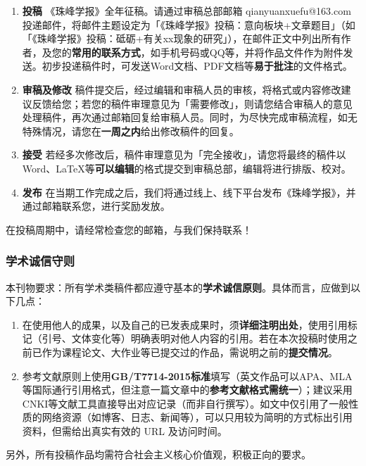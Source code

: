 \documentclass[
decoration,  %
]{qyxf-book}
\begin{document}
\begin{multicols}{2}
	\begin{enumerate}[\bfseries 1.]
		\item 
		\textbf{投稿} \;\;《珠峰学报》全年征稿。请通过审稿总部邮箱 qianyuanxuefu@163.com投递邮件，将邮件主题设定为「《珠峰学报》投稿：意向板块+文章题目」（如「《珠峰学报》投稿：砥砺+有关xx现象的研究」），在邮件正文中列出所有作者，及您的\textbf{常用的联系方式}，如手机号码或QQ等，并将作品文件作为附件发送。初步投递稿件时，可发送Word文档、PDF文档等\textbf{易于批注}的文件格式。
		\item
		\textbf{审稿及修改} \;\;稿件提交后，经过编辑和审稿人员的审核，将格式或内容修改建议反馈给您；若您的稿件审理意见为「需要修改」，则请您结合审稿人的意见处理稿件，再次通过邮箱回复给审稿人员。同时，为尽快完成审稿流程，如无特殊情况，请您在\textbf{一周之内}给出修改稿件的回复。
		\item
		\textbf{接受} \;\;若经多次修改后，稿件审理意见为「完全接收」，请您将最终的稿件以 Word、\LaTeX 等\textbf{可以编辑}的格式提交到审稿总部，编辑将进行排版、校对。
		\item
		\textbf{发布} \;\;在当期工作完成之后，我们将通过线上、线下平台发布《珠峰学报》，并通过邮箱联系您，进行奖励发放。
	\end{enumerate}
	
	在投稿周期中，请经常检查您的邮箱，与我们保持联系！
	
	
	\subsubsection{学术诚信守则}
	
    本刊物要求：所有学术类稿件都应遵守基本的\textbf{学术诚信原则}。具体而言，应做到以下几点：
	
	\begin{enumerate}[\bfseries 1.]
		\item
        在使用他人的成果，以及自己的已发表成果时，须\textbf{详细注明出处}，使用引用标记（引号、文体变化等）明确表明对他人内容的引用。若在本次投稿时使用之前已作为课程论文、大作业等已提交过的作品，需说明之前的\textbf{提交情况}。
		\item
        参考文献原则上使用\textbf{GB/T7714-2015标准}填写（英文作品可以APA、MLA等国际通行引用格式，但注意一篇文章中的\textbf{参考文献格式需统一}）；建议采用CNKI等文献工具直接导出对应记录（而非自行撰写）。如文中仅引用了一般性质的网络资源（如博客、日志、新闻等），可以只用较为简明的方式标出引用资料，但需给出真实有效的 URL 及访问时间。
	\end{enumerate}
	
	另外，所有投稿作品均需符合社会主义核心价值观，积极正向的要求。
	

\end{multicols}
\end{document}
